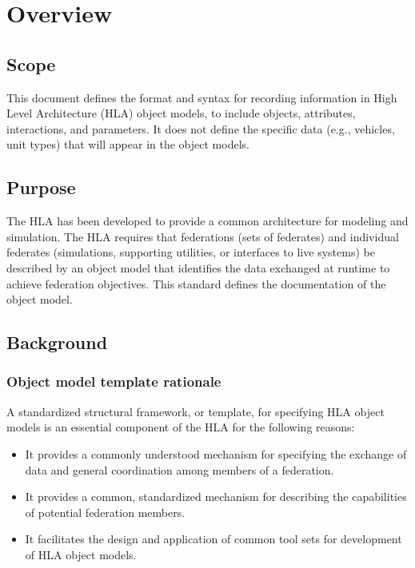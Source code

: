 \vspace*{0.62in}
\vspace{0.42in}
\section{Overview}

\subsection{Scope}
This document defines the format and syntax for recording information in High Level Architecture (HLA) object models, to include objects, attributes, interactions, and parameters. It does not define the specific data (e.g., vehicles, unit types) that will appear in the object models.

\subsection{Purpose}
The HLA has been developed to provide a common architecture for modeling and simulation. The HLA requires that federations (sets of federates) and individual federates (simulations, supporting utilities, or interfaces to live systems) be described by an object model that identifies the data exchanged at runtime to achieve federation objectives. This standard defines the documentation of the object model.

\newpage

\subsection{Background}

\subsubsection{Object model template rationale}
A standardized structural framework, or template, for specifying HLA object models is an essential component of the HLA for the following reasons:
\begin{itemize}
    \item It provides a commonly understood mechanism for specifying the exchange of data and general coordination among members of a federation.
    \item It provides a common, standardized mechanism for describing the capabilities of potential federation members.
    \item It facilitates the design and application of common tool sets for development of HLA object models.
\end{itemize}

